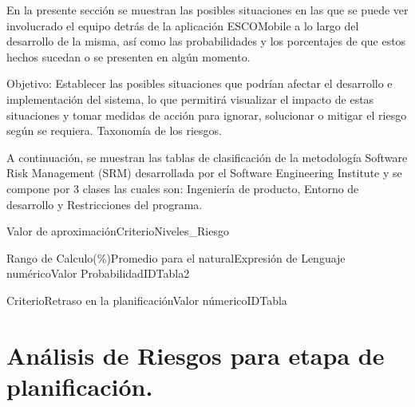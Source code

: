 \noindent
En la presente sección se muestran las posibles situaciones en las que se puede ver involucrado el equipo detrás de la 
aplicación ESCOMobile a lo largo del desarrollo de la misma, así como las probabilidades y los porcentajes de que estos hechos
sucedan o se presenten en algún momento.

\noindent
Objetivo: Establecer las posibles situaciones que podrían afectar el desarrollo e
implementación del sistema, lo que permitirá visualizar el impacto de estas situaciones y
tomar medidas de acción para ignorar, solucionar o mitigar el riesgo según se requiera.
Taxonomía de los riesgos.

\noindent
\newline
A continuación, se muestran las tablas de clasificación de la metodología Software Risk
Management (SRM) desarrollada por el Software Engineering Institute y se compone por
3 clases las cuales son: Ingeniería de producto, Entorno de desarrollo y Restricciones del
programa.\cite{Riesgos}

\begin{tablaCC}{Valor de aproximación}{Criterio}{Niveles_Riesgo}
	\caption{Niveles de riesgo.}
\end{tablaCC}

\begin{tablaCCCC}{Rango de Calculo(\%)}{Promedio para el natural}{Expresión de Lenguaje numérico}{Valor Probabilidad}{IDTabla2}
	\caption{Estimación de la probabilidad.}
\end{tablaCCCC}

\begin{tablaCCC}{Criterio}{Retraso en la planificación}{Valor númerico}{IDTabla}

	\caption{Exposición de tiempo.}
\end{tablaCCC}

\section{Análisis de Riesgos para etapa de planificación.}

